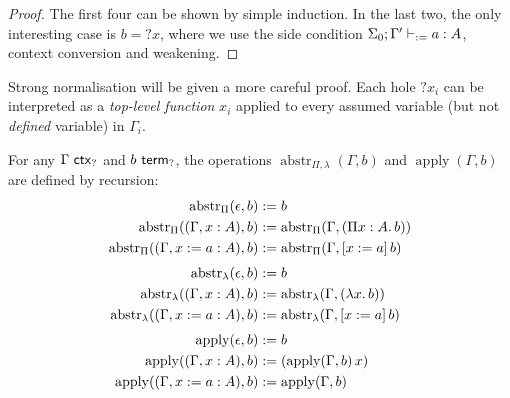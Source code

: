 \documentclass[twoside]{report}
\begin{document}
\begin{proof}
The first four can be shown by simple induction. In the last two, the only interesting case is $b = {?x}$, where we use the side condition $\Sigma_0; \Gamma' \vdash_{:=} a : A$, context conversion and weakening.
\end{proof}

Strong normalisation will be given a more careful proof. Each hole $?x_i$ can be interpreted as a \emph{top-level function} $x_i$ applied to every assumed variable (but not \emph{defined} variable) in $\Gamma_i$.

\newcommand{\abstr}{\operatorname{abstr}}
\newcommand{\apply}{\operatorname{apply}}

\begin{definition}
\label{def:context_environment_abstr_apply}
For any $\Gamma \ \mathsf{ctx}_{?}$ and $b \ \mathsf{term}_{?}$, the operations $\abstr_{\Pi,\lambda}(\Gamma, b)$ and $\apply(\Gamma, b)$ are defined by recursion:
$$
\begin{aligned}
    \abstr_\Pi(\epsilon, b) &\defeq b \\
    \abstr_\Pi((\Gamma, x : A), b) &\defeq \abstr_\Pi(\Gamma, (\ppi x A b)) \\
    \abstr_\Pi((\Gamma, x \defeq a : A), b) &\defeq \abstr_\Pi(\Gamma, \llet x a b) \\[0.3em]
    \abstr_\lambda(\epsilon, b) &\defeq b \\
    \abstr_\lambda((\Gamma, x : A), b) &\defeq \abstr_\lambda(\Gamma, (\lam x b)) \\
    \abstr_\lambda((\Gamma, x \defeq a : A), b) &\defeq \abstr_\lambda(\Gamma, \llet x a b) \\[0.3em]
    \apply(\epsilon, b) &\defeq b \\
    \apply((\Gamma, x : A), b) &\defeq (\app {\apply(\Gamma, b)} x) \\
    \apply((\Gamma, x \defeq a : A), b) &\defeq \apply(\Gamma, b) \\
\end{aligned}
$$
\end{definition}

\end{document}
